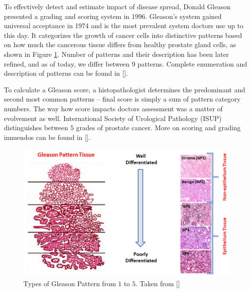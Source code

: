 To effectively detect and estimate impact of disease spread, Donald Gleason presented a grading and scoring system in 1996. Gleason's system gained universal acceptance in 1974 and is the most prevalent system doctors use up to this day. It categorizes the growth of cancer cells into distinctive patterns based on how much the cancerous tissue differs from healthy prostate gland cells, as shown in Figure \ref{fig:gp}. Number of patterns and their description has been later refined, and as of today, we differ between 9 patterns. Complete enumeration and description of patterns can be found in [].

To calculate a Gleason score, a histopathologist determines the predominant and second most common patterns -- final score is simply a sum of pattern category numbers. The way how score impacts doctors assessment was a matter of evolvement as well. International Society of Urological Pathology (ISUP) distinguishes between $5$ grades of prostate cancer. More on scoring and grading innuendos can be found in [].

\begin{figure}[!h]
    \begin{center}
    \begin{minipage}{0.75\textwidth}
      \includegraphics[width=\textwidth]{img/gp-classification.png}
    \end{minipage}
    \caption{Types of Gleason Pattern from $1$ to $5$. Taken from []}
    \label{fig:gp}
    \end{center}
\end{figure}

